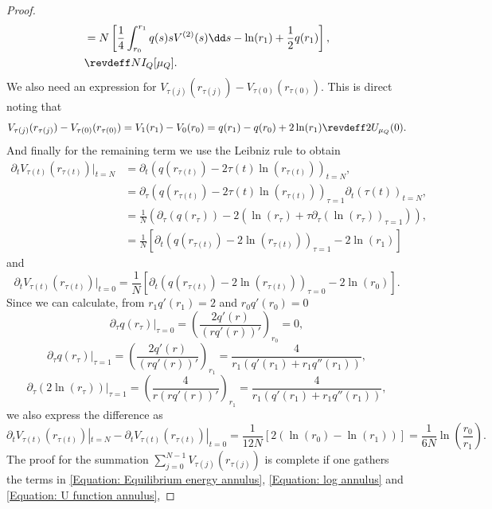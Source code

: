 \begin{proof}
\begin{align}
		& = N \left[\frac{1}{4} \int_{r_0}^{r_1} q(s) s V^{(2)}(s) \dd s- \ln(r_1) + \frac{1}{2} q(r_1) \right],  \\
		& \revdeff N I_Q[\mu_Q].
		\label{Equation: Equilibrium energy annulus}
	\end{align}
	We also need an expression for $ V_{\tau(j)}(r_{\tau(j)})  - V_{\tau(0)}(r_{\tau(0)})$. This is direct noting that
	\begin{equation}
		V_{\tau(j)}(r_{\tau(j)})  - V_{\tau(0)}(r_{\tau(0)}) = V_1(r_1) - V_0(r_0) = q(r_1) - q(r_0) + 2 \ln(r_1) \revdeff 2 U_{\mu_Q}(0).
		\label{Equation: U function annulus}
	\end{equation}
	And finally for the remaining term we use the Leibniz rule to obtain
	\begin{align}
		\partial_t V_{\tau(t)}(r_{\tau(t)})|_{t=N}	& = \partial_t \left( q(r_{\tau(t)}) - 2 \tau(t) \ln(r_{\tau(t)}) \right)_{t=N}, \\
		& = \partial_\tau \left( q(r_{\tau(t)}) - 2 \tau(t) \ln(r_{\tau(t)}) \right)_{\tau=1} \partial_t \left( \tau(t) \right)_{t =N}, \\
		& = \frac{1}{N} \left( \partial_\tau (q(r_{\tau})) - 2 \left( \ln(r_{\tau}) + \tau \partial_\tau\left( \ln(r_{\tau}) \right)_{\tau = 1} \right) \right), \\
		& = \frac{1}{N} \left[ \partial_t(q(r_{\tau(t)}) - 2 \ln(r_{\tau(t)}))_{\tau=1} - 2 \ln(r_1) \right]
	\end{align}
	and
	\begin{equation}
		\partial_t V_{\tau(t)}(r_{\tau(t)})|_{t=0} = \frac{1}{N} \left[ \partial_t(q(r_{\tau(t)}) - 2 \ln(r_{\tau(t)}))_{\tau= 0} - 2 \ln(r_0) \right].
	\end{equation}
	Since we can calculate, from $r_1 q'(r_1) = 2$ and $r_0 q'(r_0) = 0$
	\begin{equation}
		\partial_\tau q(r_{\tau}) |_{\tau = 0} = \left( \frac{2 q'(r)}{(r q'(r))'}\right)_{r_0} = 0,
	\end{equation}
	\begin{equation}
		\partial_\tau q(r_{\tau}) |_{\tau = 1} = \left( \frac{2 q'(r)}{(r q'(r))'}\right)_{r_1} = \frac{4}{r_1(q'(r_1) + r_1 q''(r_1))},
	\end{equation}
	\begin{equation}
		\partial_\tau (2 \ln(r_\tau)) |_{\tau = 1} = \left( \frac{4}{r (r q'(r))'}\right)_{r_1} = \frac{4}{r_1(q'(r_1) + r_1 q''(r_1))},
	\end{equation}
	we also express the difference as
	\begin{equation}
		\partial_t V_{\tau(t)}(r_{\tau(t)})|_{t=N}  - \partial_t V_{\tau(t)}(r_{\tau(t)})|_{t=0} = \frac{1}{12 N} \left[ 2 (\ln(r_0) - \ln(r_1)) \right] = \frac{1}{6 N} \ln\left(\frac{r_0}{r_1}\right) .
		\label{Equation: log annulus}
	\end{equation}
	The proof for the summation $\sum_{j=0}^{N-1} V_{\tau(j)}(r_{\tau(j)})$ is complete if one gathers the terms in \eqref{Equation: Equilibrium energy annulus}, \eqref{Equation: log annulus} and \eqref{Equation: U function annulus},

\end{proof}

